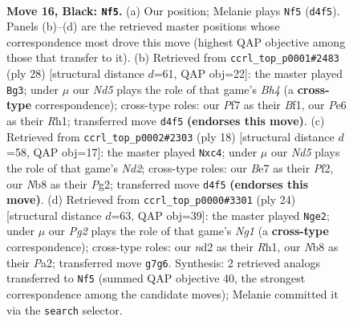 \documentclass[11pt]{article}
\begin{document}
\clearpage

\begin{figure}[p]\centering
\begin{subfigure}{0.46\textwidth}\centering
\resizebox{\linewidth}{!}{%
\newchessgame
\chessboard[
  setfen={rnb1k2r/pp2bppp/4p3/3pP3/3n1P2/3B2P1/P2NN2P/R1B1K2R b KQ - 2 16},
  showmover=false,
  pgfstyle=straightmove, color=movearrow, markmove={d4-f5}
]}
\caption{}
\end{subfigure}\hfill
\begin{subfigure}{0.46\textwidth}\centering
\resizebox{\linewidth}{!}{%
\newchessgame
\chessboard[
  setfen={r1b1k2r/pp1n1p2/7p/3p2p1/Nb1Nn2B/4P3/PP3PPP/R2K1B1R w kq - 0 15},
  showmover=false,
  pgfstyle=straightmove, color=movearrow, markmove={h4-g3}
]}
\caption{}
\end{subfigure}
\\[4pt]
\begin{subfigure}{0.46\textwidth}\centering
\resizebox{\linewidth}{!}{%
\newchessgame
\chessboard[
  setfen={r2k2nr/pppn2pp/5p2/4p3/1bb1P3/2N1B3/PPPN1PPP/R3K2R w KQ - 0 10},
  showmover=false,
  pgfstyle=straightmove, color=movearrow, markmove={d2-c4}
]}
\caption{}
\end{subfigure}\hfill
\begin{subfigure}{0.46\textwidth}\centering
\resizebox{\linewidth}{!}{%
\newchessgame
\chessboard[
  setfen={rnb1r1k1/ppp4p/1n4p1/4bp2/4P3/2NBB2P/PP3PP1/2R1K1NR w K - 0 13},
  showmover=false,
  pgfstyle=straightmove, color=movearrow, markmove={g1-e2}
]}
\caption{}
\end{subfigure}
\caption{\textbf{Move 16, Black: \texttt{Nf5}.} (a) Our position; Melanie plays \texttt{Nf5} (\texttt{d4f5}). Panels (b)--(d) are the retrieved master positions whose correspondence most drove this move (highest QAP objective among those that transfer to it). (b) Retrieved from \texttt{ccrl\_top\_p0001\#2483} (ply 28) [structural distance $d$=61, QAP obj=22]: the master played \texttt{Bg3}; under $\mu$ our \emph{Nd5} plays the role of that game's \emph{Bh4} (a \textbf{cross-type} correspondence); cross-type roles: our \emph{P}f7 as their \emph{B}f1, our \emph{P}e6 as their \emph{R}h1; transferred move \texttt{d4f5} \textbf{(endorses this move)}. (c) Retrieved from \texttt{ccrl\_top\_p0002\#2303} (ply 18) [structural distance $d$=58, QAP obj=17]: the master played \texttt{Nxc4}; under $\mu$ our \emph{Nd5} plays the role of that game's \emph{Nd2}; cross-type roles: our \emph{B}e7 as their \emph{P}f2, our \emph{N}b8 as their \emph{P}g2; transferred move \texttt{d4f5} \textbf{(endorses this move)}. (d) Retrieved from \texttt{ccrl\_top\_p0000\#3301} (ply 24) [structural distance $d$=63, QAP obj=39]: the master played \texttt{Nge2}; under $\mu$ our \emph{Pg2} plays the role of that game's \emph{Ng1} (a \textbf{cross-type} correspondence); cross-type roles: our \emph{n}d2 as their \emph{R}h1, our \emph{N}b8 as their \emph{P}a2; transferred move \texttt{g7g6}. Synthesis: 2 retrieved analogs transferred to \texttt{Nf5} (summed QAP objective 40, the strongest correspondence among the candidate moves); Melanie committed it via the \texttt{search} selector.}
\label{fig:thought-m31}
\end{figure}
\end{document}
